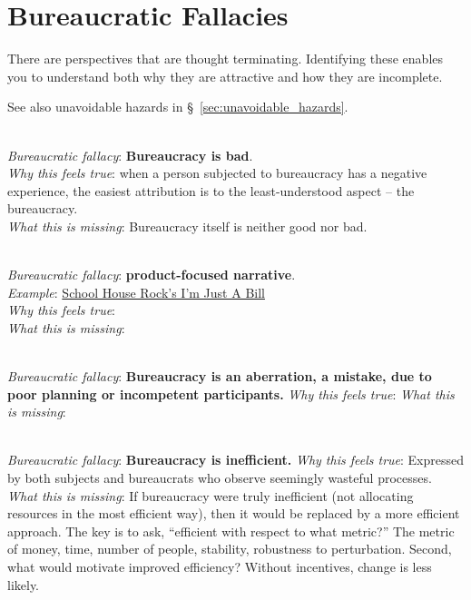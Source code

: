 \section{Bureaucratic Fallacies\label{sec:fallacies}}

There are perspectives that are \gls{thought terminating}. Identifying these enables you to understand both why they are attractive and how they are incomplete.

See also unavoidable hazards in \S~\ref{sec:unavoidable_hazards}.

\ \\

\textit{Bureaucratic fallacy}: \textbf{Bureaucracy is bad}. \\
\textit{Why this feels true}: when a person subjected to bureaucracy has a negative experience, the easiest attribution is to the least-understood aspect -- the bureaucracy.\\
\textit{What this is missing}: Bureaucracy itself is neither good nor bad. 

\ \\

\textit{Bureaucratic fallacy}: \textbf{product-focused narrative}. \\
\textit{Example}: \href{https://www.youtube.com/watch?v=OgVKvqTItto}{School House Rock's I'm Just A Bill}\\
\textit{Why this feels true}: \\
\textit{What this is missing}: 

\ \\

\textit{Bureaucratic fallacy}: \textbf{Bureaucracy is an aberration, a mistake, due to poor planning or incompetent participants.}
\textit{Why this feels true}: 
\textit{What this is missing}: 

\ \\

\textit{Bureaucratic fallacy}: \textbf{Bureaucracy is inefficient.}
\textit{Why this feels true}: Expressed by both subjects and bureaucrats who observe seemingly wasteful processes. 
\textit{What this is missing}: If bureaucracy were truly inefficient (not allocating resources in the most efficient way), then it would be replaced by a more efficient approach. The key is to ask, ``efficient with respect to what metric?'' The metric of money, time, number of people, stability, robustness to perturbation.  Second, what would motivate improved efficiency? Without incentives, change is less likely. 

